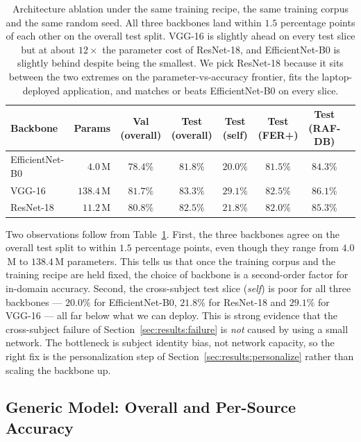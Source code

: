 \documentclass[12pt,a4paper]{article}
\begin{document}
\begin{table}[H]
  \centering
  \footnotesize
  \begin{tabular}{lrcccccc}
    \toprule
    Backbone   & Params         & Val (overall) & Test (overall) & Test (self) & Test (FER+) & Test (RAF-DB) \\
    \midrule
    EfficientNet-B0 & $4.0$\,M & $78.4\%$ & $81.8\%$ & $20.0\%$ & $81.5\%$ & $84.3\%$ \\
    VGG-16     & $138.4$\,M         & $81.7\%$ & $83.3\%$ & $29.1\%$ & $82.5\%$ & $86.1\%$ \\
    ResNet-18  & $\mathbf{11.2}$\,M & $80.8\%$ & $82.5\%$ & $21.8\%$ & $82.0\%$ & $85.3\%$ \\
    \bottomrule
  \end{tabular}
  \caption{\footnotesize Architecture ablation under the same training
  recipe, the same training corpus and the same random seed.
  All three backbones land within $1.5$ percentage points of
  each other on the overall test split. VGG-16 is slightly
  ahead on every test slice but at about $12\times$ the
  parameter cost of ResNet-18, and EfficientNet-B0 is slightly
  behind despite being the smallest. We pick ResNet-18 because
  it sits between the two extremes on the parameter-vs-accuracy
  frontier, fits the laptop-deployed application, and matches
  or beats EfficientNet-B0 on every slice.}
  \label{tab:archabl}
\end{table}

Two observations follow from Table~\ref{tab:archabl}. First,
the three backbones agree on the overall test split to within
$1.5$ percentage points, even though they range from $4.0$\,M
to $138.4$\,M parameters. This tells us that once the training
corpus and the training recipe are held fixed, the choice of
backbone is a second-order factor for in-domain accuracy.
Second, the cross-subject test slice (\emph{self}) is poor for
all three backbones --- $20.0\%$ for EfficientNet-B0, $21.8\%$
for ResNet-18 and $29.1\%$ for VGG-16 --- all far below what
we can deploy. This is strong evidence that the cross-subject
failure of Section~\ref{sec:results:failure} is \emph{not}
caused by using a small network. The bottleneck is subject
identity bias, not network capacity, so the right fix is the
personalization step of
Section~\ref{sec:results:personalize} rather than scaling the
backbone up.

\subsection{Generic Model: Overall and Per-Source Accuracy}
\label{sec:results:overall}
\end{document}
